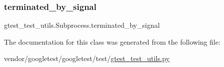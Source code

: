 \subsubsection{\texorpdfstring{terminated\+\_\+by\+\_\+signal}{terminated\_by\_signal}}
{\footnotesize\ttfamily gtest\+\_\+test\+\_\+utils.\+Subprocess.\+terminated\+\_\+by\+\_\+signal}



The documentation for this class was generated from the following file\+:\begin{DoxyCompactItemize}
\item 
vendor/googletest/googletest/test/\hyperlink{gtest__test__utils_8py}{gtest\+\_\+test\+\_\+utils.\+py}\end{DoxyCompactItemize}
